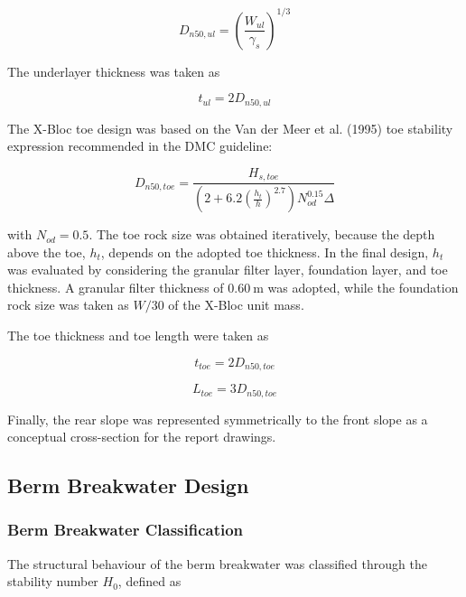 \documentclass[a4paper, 11pt]{article}
\begin{document}
\begin{equation}
    D_{n50,ul}=
    \left(\frac{W_{ul}}{\gamma_s}\right)^{1/3}
\end{equation}

The underlayer thickness was taken as

\begin{equation}
    t_{ul}=2D_{n50,ul}
\end{equation}

The X-Bloc toe design was based on the Van der Meer et al. (1995) toe stability expression recommended in the DMC guideline:

\begin{equation}
    D_{n50,toe}=
    \frac{H_{s,toe}}
    {\left(2+6.2\left(\frac{h_t}{h}\right)^{2.7}\right)N_{od}^{0.15}\Delta}
\end{equation}

with \(N_{od}=0.5\). The toe rock size was obtained iteratively, because the depth above the toe, \(h_t\), depends on the adopted toe thickness. In the final design, \(h_t\) was evaluated by considering the granular filter layer, foundation layer, and toe thickness. A granular filter thickness of \(0.60~\mathrm{m}\) was adopted, while the foundation rock size was taken as \(W/30\) of the X-Bloc unit mass.

The toe thickness and toe length were taken as

\begin{equation}
    t_{toe}=2D_{n50,toe}
\end{equation}

\begin{equation}
    L_{toe}=3D_{n50,toe}
\end{equation}

Finally, the rear slope was represented symmetrically to the front slope as a conceptual cross-section for the report drawings.

\subsection{Berm Breakwater Design}

\subsubsection{Berm Breakwater Classification}

\hspace*{0.5cm} The structural behaviour of the berm breakwater was classified through the stability number \(H_0\), defined as
\end{document}
